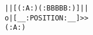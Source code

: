 \documentclass[12pt, a4paper]{scrreprt}
\begin{document}
    \texttt{||[(:A:)(:BBBBB:)]||}\\
    \texttt{o|[\_\_:POSITION:\_\_]>>}\\
    \texttt{(:A:)}
\end{document}
